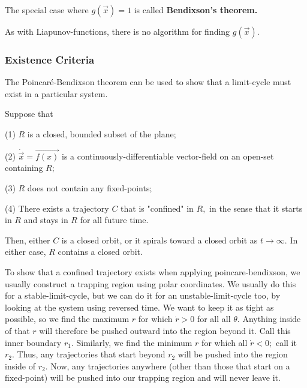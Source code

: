 \documentclass{article}
\begin{document}
The special case where $g(\vec{x}) = 1$ is called \textbf{Bendixson's theorem.}

As with \@{Liapunov-functions}, there is no algorithm for finding $g(\vec{x}).$


\subsubsection{Existence Criteria}

The Poincaré-Bendixson theorem can be used to show that a \@{limit-cycle} must exist in a particular system.

\begin{theorem}\label{poincare-bendixson}
Suppose that

(1) $R$ is a \@{closed}, \@{bounded} \@{subset} of the plane;

(2) $\dot{\vec{x}} = \vec{f(x)}$ is a \@{continuously-differentiable} \@{vector-field} on an \@{open-set} containing $R;$

(3) $R$ does not contain any \@{fixed-points};

(4) There exists a \@{trajectory} $C$ that is "confined" in $R,$ in the sense that it starts in $R$ and stays in $R$ for all future time.

Then, either $C$ is a closed orbit, or it spirals toward a closed orbit as $t \to \infty.$ In either case, $R$ contains a closed orbit.
\end{theorem}

To show that a confined \@{trajectory} exists when applying \@{poincare-bendixson}, we usually construct a trapping region using polar coordinates. We usually do this for a \@{stable-limit-cycle}, but we can do it for an \@{unstable-limit-cycle} too, by looking at the system using reversed time. We want to keep it as tight as possible, so we find the maximum $r$ for which $\dot{r} > 0$ for all all $\theta.$ Anything inside of that $r$ will therefore be pushed outward into the region beyond it. Call this inner boundary $r_1.$ Similarly, we find the minimum $r$ for which all $\dot{r} < 0;$ call it $r_2.$ Thus, any trajectories that start beyond $r_2$ will be pushed into the region inside of $r_2.$ Now, any trajectories anywhere (other than those that start on a \@{fixed-point}) will be pushed into our trapping region and will never leave it.
\end{document}

